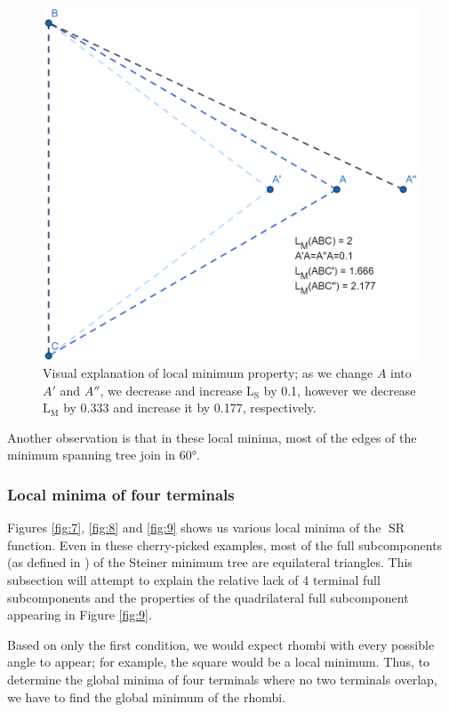 \documentclass{mpaper}
\begin{document}
\begin{figure}[h!]
  \begin{center}
  \includegraphics[scale=1.3]{plot9.png}
  \end{center}
  \caption{\label{fig:10}Visual explanation of local minimum property; as we change $A$ into $A'$ and $A''$, we decrease and increase $\operatorname{L_S}$ by 0.1, however we decrease $\operatorname{L_M}$ by 0.333 and increase it by 0.177, respectively.}
\end{figure}

Another observation is that in these local minima, most of the edges of the minimum spanning tree join in 60°. 

\subsubsection{Local minima of four terminals}
Figures \ref{fig:7}, \ref{fig:8} and \ref{fig:9} shows us various local minima of the $\operatorname{SR}$ function. Even in these cherry-picked examples, most of the full subcomponents (as defined in \cite{GP1968}) of the Steiner minimum tree are equilateral triangles. This subsection will attempt to explain the relative lack of 4 terminal full subcomponents and the properties of the  quadrilateral full subcomponent appearing in Figure \ref{fig:9}.

Based on only the first condition, we would expect rhombi with every possible angle to appear; for example, the square would be a local minimum. Thus, to determine the global minima of four terminals where no two terminals overlap, we have to find the global minimum of the rhombi.
\end{document}
